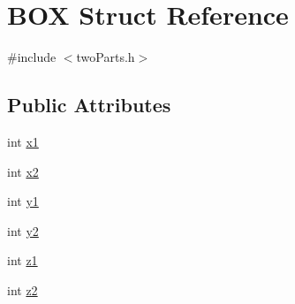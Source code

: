 \hypertarget{struct_b_o_x}{\section{B\-O\-X Struct Reference}
\label{struct_b_o_x}
}


{\ttfamily \#include $<$two\-Parts.\-h$>$}

\subsection*{Public Attributes}
\begin{DoxyCompactItemize}
\item 
int \hyperlink{struct_b_o_x_a01dbc6cf725f1f35c7b2da3714be723a}{x1}
\item 
int \hyperlink{struct_b_o_x_a4e0c431804e85d22cd0f91fffd031ea0}{x2}
\item 
int \hyperlink{struct_b_o_x_a6408359fd2079e1c94289068813238b1}{y1}
\item 
int \hyperlink{struct_b_o_x_a6c454889006e69e5f98cff2b7a5b0d3c}{y2}
\item 
int \hyperlink{struct_b_o_x_a203700d98ec1eb1304cda1333b3dc418}{z1}
\item 
int \hyperlink{struct_b_o_x_ac0a1182e03729bdd1ca85e86697a0df3}{z2}
\end{DoxyCompactItemize}


